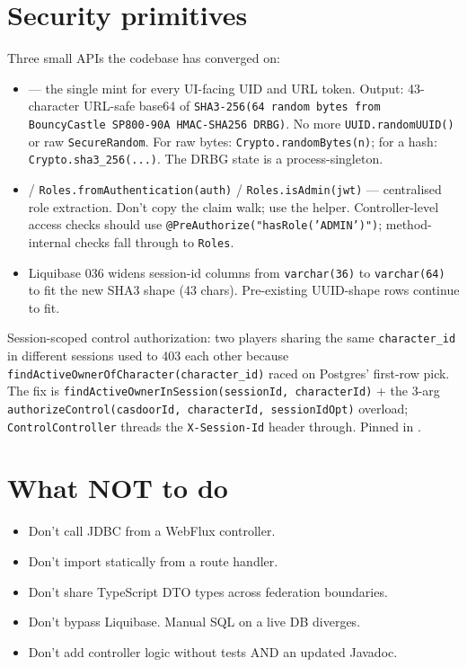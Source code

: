 \documentclass[11pt,a4paper,openany]{book}
\begin{document}
\chapter{Security primitives}
Three small APIs the codebase has converged on:

\begin{itemize}
  \item {} --- the single mint for every
        UI-facing UID and URL token. Output: 43-character URL-safe
        base64 of \texttt{SHA3-256(64 random bytes from BouncyCastle
        SP800-90A HMAC-SHA256 DRBG)}. No more
        \texttt{UUID.randomUUID()} or raw \texttt{SecureRandom}.
        For raw bytes: \texttt{Crypto.randomBytes(n)}; for a hash:
        \texttt{Crypto.sha3\_256(...)}. The DRBG state is a
        process-singleton.
  \item {} /
        \texttt{Roles.fromAuthentication(auth)} /
        \texttt{Roles.isAdmin(jwt)} --- centralised role extraction.
        Don't copy the claim walk; use the helper. Controller-level
        access checks should use
        \texttt{@PreAuthorize("hasRole('ADMIN')")}; method-internal
        checks fall through to \texttt{Roles}.
  \item Liquibase 036 widens session-id columns from
        \texttt{varchar(36)} to \texttt{varchar(64)} to fit the new
        SHA3 shape (43 chars). Pre-existing UUID-shape rows continue
        to fit.
\end{itemize}

Session-scoped control authorization: two players sharing the same
\texttt{character\_id} in different sessions used to 403 each other
because \texttt{findActiveOwnerOfCharacter(character\_id)} raced on
Postgres' first-row pick. The fix is
\texttt{findActiveOwnerInSession(sessionId, characterId)} +
the 3-arg \texttt{authorizeControl(casdoorId, characterId,
sessionIdOpt)} overload; \texttt{ControlController} threads the
\texttt{X-Session-Id} header through. Pinned in
.

\chapter{What NOT to do}
\begin{itemize}
  \item Don't call JDBC from a WebFlux controller.
  \item Don't import 
        statically from a route handler.
  \item Don't share TypeScript DTO types across federation boundaries.
  \item Don't bypass Liquibase. Manual SQL on a live DB diverges.
  \item Don't add controller logic without tests AND an updated
        Javadoc.
\end{itemize}
\end{document}
